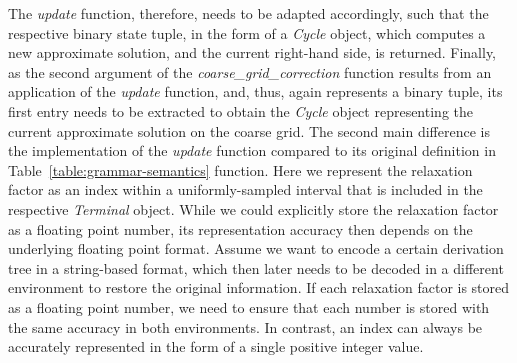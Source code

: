 The \emph{update} function, therefore, needs to be adapted accordingly, such that the respective binary state tuple, in the form of a \emph{Cycle} object, which computes a new approximate solution, and the current right-hand side, is returned.
Finally, as the second argument of the \emph{coarse\_grid\_correction} function results from an application of the \emph{update} function, and, thus, again represents a binary tuple, its first entry needs to be extracted to obtain the \emph{Cycle} object representing the current approximate solution on the coarse grid.
The second main difference is the implementation of the \emph{update} function compared to its original definition in Table~\ref{table:grammar-semantics} function.
Here we represent the relaxation factor as an index within a uniformly-sampled interval that is included in the respective \emph{Terminal} object.
While we could explicitly store the relaxation factor as a floating point number, its representation accuracy then depends on the underlying floating point format.
Assume we want to encode a certain derivation tree in a string-based format, which then later needs to be decoded in a different environment to restore the original information.
If each relaxation factor is stored as a floating point number, we need to ensure that each number is stored with the same accuracy in both environments.
In contrast, an index can always be accurately represented in the form of a single positive integer value.

